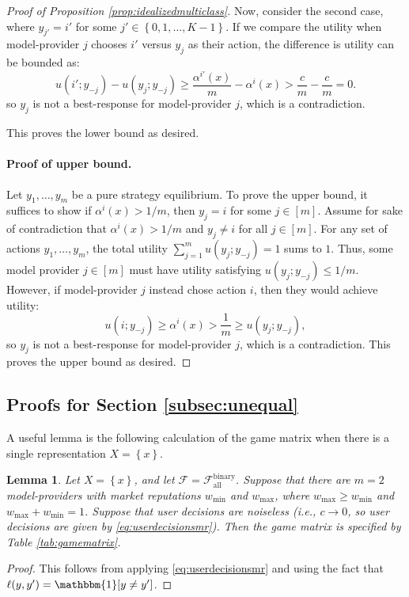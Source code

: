 \documentclass[letterpaper,11pt]{article}
\newtheorem{lemma}{Lemma}
\theoremstyle{plain}
\begin{document}
\begin{proof}[Proof of Proposition \ref{prop:idealizedmulticlass}]
Now, consider the second case, where $y_{j'} = i'$ for some $j' \in \left\{0, 1, \ldots, K-1\right\}$. If we compare the utility when model-provider $j$ chooses $i'$ versus $y_j$ as their action, the difference is utility can be bounded as: 
\[u(i'; y_{-j}) - u(y_j; y_{-j}) \ge \frac{\alpha^{i'}(x)}{m} - \alpha^{i}(x) > \frac{c}{m} - \frac{c}{m} = 0. \]
so $y_j$ is not a best-response for model-provider $j$, which is a contradiction. 

This proves the lower bound as desired. 

\paragraph{Proof of upper bound.} Let $y_1, \ldots, y_m$ be a pure strategy equilibrium. To prove the upper bound, it suffices to show if $\alpha^i(x) > 1/m$, then $y_j = i$ for some $j \in [m]$. Assume for sake of contradiction that $\alpha^i(x) > 1/m$ and $y_j \neq i$ for all $j \in [m]$. For any set of actions $y_1, \ldots, y_m$, the total utility $\sum_{j=1}^m u(y_j; y_{-j}) = 1$ sums to $1$. Thus, some model provider $j \in [m]$ must have utility satisfying $u(y_j; y_{-j}) \le 1/m$. However, if model-provider $j$ instead chose action $i$, then they would achieve utility:
\[u(i; y_{-j}) \ge \alpha^i(x) > \frac{1}{m} \ge u(y_j; y_{-j}), \]
so $y_j$ is not a best-response for model-provider $j$, which is a contradiction. This proves the upper bound as desired. 


\end{proof}

\subsection{Proofs for Section \ref{subsec:unequal}}\label{appendix:proofsunequal}



A useful lemma is the following calculation of the game matrix when there is a single representation $X = \left\{x\right\}$. 
\begin{lemma}
\label{lemma:gamematrix}
Let $X = \left\{x \right\}$, and let $\mathcal{F} = \mathcal{F}^{\text{binary}}_{\text{all}}$. Suppose that there are $m=2$ model-providers with market reputations $w_{\text{min}}$ and $w_{\text{max}}$, where $w_{\text{max}} \ge w_{\text{min}}$ and $w_{\text{max}} +  w_{\text{min}} = 1$. Suppose that user decisions are noiseless (i.e., $c \rightarrow 0$, so user decisions are given by \eqref{eq:userdecisionsmr}). Then the game matrix is specified by Table \ref{tab:gamematrix}.  
\end{lemma}
\begin{proof}
This follows from applying \eqref{eq:userdecisionsmr} and using the fact that $\ell(y, y') = \mathbbm{1}[y \neq y']$. 
\end{proof}
\end{document}
